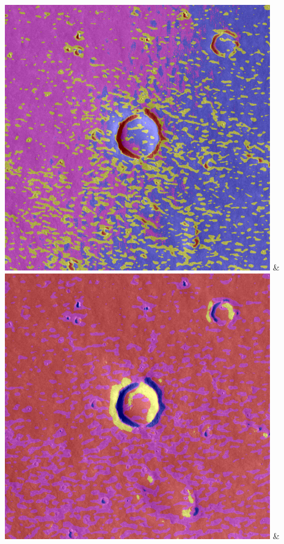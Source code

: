 \begin{table}[h!]
\begin{tabularx}{\textwidth}
		\includegraphics[width=0.9\linewidth]{images/gen/filter_size/p03_01.png_0.50.png} &
		\includegraphics[width=0.9\linewidth]{images/gen/filter_size/p03_01.png_0.75.png} &

\end{tabularx}
\end{table}
